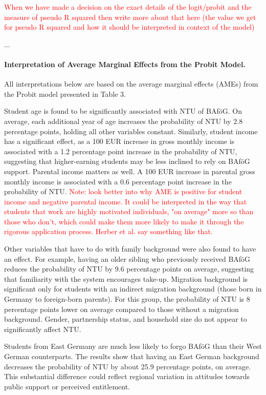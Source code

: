 \textcolor{red}{When we have made a decision on the exact details of the logit/probit and the measure of pseudo R squared then write more about that here (the value we get for pseudo R squared and how it should be interpreted in context of the model)}





...

\paragraph{Interpretation of Average Marginal Effects from the Probit Model.} All interpretations below are based on the average marginal effects (AMEs) from the Probit model presented in Table 3.

Student age is found to be significantly associated with NTU of BAföG. On average, each additional year of age increases the probability of NTU by 2.8 percentage points, holding all other variables constant. Similarly, student income has a significant effect, as a 100 EUR increase in gross monthly income is associated with a 1.2 percentage point increase in the probability of NTU, suggesting that higher-earning students may be less inclined to rely on BAföG support. Parental income matters as well. A 100 EUR increase in parental gross monthly income is associated with a 0.6 percentage point increase in the probability of NTU. \textcolor{red}{Note: look better into why AME is positive for student income and negative parental income. It could be interpreted in the way that students that work are highly motivated individuals, "on average" more so than those who don't, which could make them more likely to make it through the rigorous application process. Herber et al. say something like that.}

Other variables that have to do with family background were also found to have an effect. For example, having an older sibling who previously received BAföG reduces the probability of NTU by 9.6 percentage points on average, suggesting that familiarity with the system encourages take-up. Migration background is significant only for students with an indirect migration background (those born in Germany to foreign-born parents). For this group, the probability of NTU is 8 percentage points lower on average compared to those without a migration background.  Gender, partnership status, and household size do not appear to significantly affect NTU.

Students from East Germany are much less likely to forgo BAföG than their West German counterparts. The results show that having an East German background decreases the probability of NTU by about 25.9 percentage points, on average. This substantial difference could reflect regional variation in attitudes towards public support or perceived entitlement.

